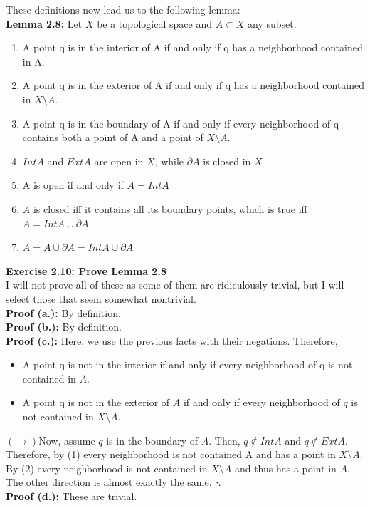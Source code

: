 \documentclass{article}
\begin{document}
These definitions now lead us to the following lemma:\\
\textbf{Lemma 2.8:} Let $X$ be a topological space and $A\subset X$ any subset.
\begin{enumerate}[label=(\alph*.)]
    \item A point q is in the interior of A if and only if q has a neighborhood contained in A.
    \item A point q is in the exterior of A if and only if q has a neighborhood contained in $X\setminus A$.
    \item A point q is in the boundary of A if and only if every neighborhood of q contains both a point of A and a point of $X\setminus A$.
    \item $Int A$ and $Ext A$ are open in $X$, while $\partial A$ is closed in $X$
    \item A is open if and only if $A=Int A$
    \item $A$ is closed iff it contains all its boundary points, which is true iff $A=IntA\cup \partial A$.
    \item $\bar{A}=A\cup\partial A=IntA\cup\partial A$
\end{enumerate}
\vspace{\baselineskip}
\textbf{Exercise 2.10: Prove Lemma 2.8}\\
I will not prove all of these as some of them are ridiculously trivial, but I will select those that seem somewhat nontrivial.\\
\textbf{Proof (a.):} By definition.\\
\textbf{Proof (b.):} By definition.\\
\textbf{Proof (c.):} Here, we use the previous facts with their negations. Therefore,
\begin{itemize}
    \item A point q is not in the interior if and only if every neighborhood of q is not contained in $A$.
    \item A point q is not in the exterior of $A$ if and only if every neighborhood of $q$ is not contained in $X\setminus A$.
\end{itemize}
$(\to)$Now, assume $q$ is in the boundary of $A$. Then, $q\notin IntA$ and $q\notin ExtA$. Therefore, by (1) every neighborhood is not contained A and has a point in $X\setminus A$. By (2) every neighborhood is not contained in $X\setminus A$ and thus has a point in $A$. The other direction is almost exactly the same. $\square$.\\
\textbf{Proof (d.):} These are trivial.\\
\end{document}
